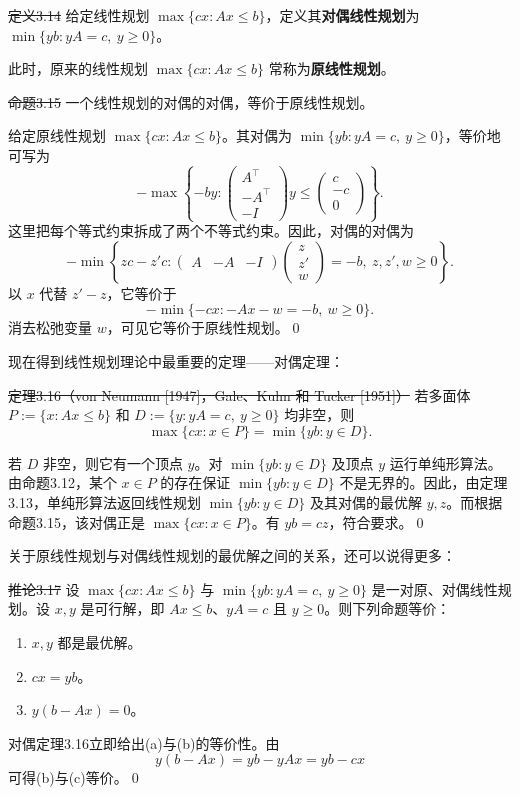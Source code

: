 \st{定义3.14} 给定线性规划 $\max\{cx:Ax\le b\}$，定义其\textbf{对偶线性规划}为 $\min\{yb:yA=c,\ y\ge0\}$。

此时，原来的线性规划 $\max\{cx:Ax\le b\}$ 常称为\textbf{原线性规划}。

\st{命题3.15} 一个线性规划的对偶的对偶，等价于原线性规划。

\pr 给定原线性规划 $\max\{cx:Ax\le b\}$。其对偶为 $\min\{yb:yA=c,\ y\ge0\}$，等价地可写为
\[
-\max\left\{-by:
\begin{pmatrix}A^\top\\-A^\top\\-I\end{pmatrix}y
\le\begin{pmatrix}c\\-c\\0\end{pmatrix}
\right\}.
\]
这里把每个等式约束拆成了两个不等式约束。因此，对偶的对偶为
\[
-\min\left\{zc-z'c:
\begin{pmatrix}A&-A&-I\end{pmatrix}
\begin{pmatrix}z\\z'\\w\end{pmatrix}
=-b,\ z,z',w\ge0\right\}.
\]
以 $x$ 代替 $z'-z$，它等价于
\[
-\min\{-cx:-Ax-w=-b,\ w\ge0\}.
\]
消去松弛变量 $w$，可见它等价于原线性规划。\qed

现在得到线性规划理论中最重要的定理——对偶定理：

\st{定理3.16（von Neumann [1947]，Gale、Kuhn 和 Tucker [1951]）} 若多面体 $P:=\{x:Ax\le b\}$ 和 $D:=\{y:yA=c,\ y\ge0\}$ 均非空，则
\[
\max\{cx:x\in P\}=\min\{yb:y\in D\}.
\]

\pr 若 $D$ 非空，则它有一个顶点 $y$。对 $\min\{yb:y\in D\}$ 及顶点 $y$ 运行单纯形算法。由命题3.12，某个 $x\in P$ 的存在保证 $\min\{yb:y\in D\}$ 不是无界的。因此，由定理3.13，单纯形算法返回线性规划 $\min\{yb:y\in D\}$ 及其对偶的最优解 $y,z$。而根据命题3.15，该对偶正是 $\max\{cx:x\in P\}$。有 $yb=cz$，符合要求。\qed

关于原线性规划与对偶线性规划的最优解之间的关系，还可以说得更多：

\st{推论3.17} 设 $\max\{cx:Ax\le b\}$ 与 $\min\{yb:yA=c,\ y\ge0\}$ 是一对原、对偶线性规划。设 $x,y$ 是可行解，即 $Ax\le b$、$yA=c$ 且 $y\ge0$。则下列命题等价：
\begin{enumerate}[label=(\alph*)]
\item $x,y$ 都是最优解。
\item $cx=yb$。
\item $y(b-Ax)=0$。
\end{enumerate}
\pr 对偶定理3.16立即给出(a)与(b)的等价性。由
\[
y(b-Ax)=yb-yAx=yb-cx
\]
可得(b)与(c)等价。\qed

